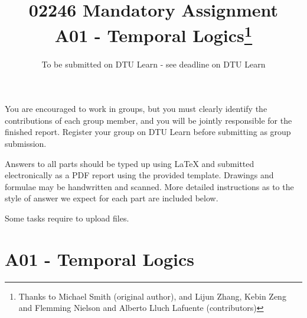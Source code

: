 \documentclass[12pt,a4paper]{article}
\title{02246 Mandatory Assignment\\
A01 - Temporal Logics\footnote{Thanks to Michael Smith (original author), and Lijun Zhang, Kebin Zeng and Flemming Nielson and Alberto Lluch Lafuente (contributors)}}
\date{To be submitted on DTU Learn - see deadline on DTU Learn}
\begin{document}
\maketitle

\noindent
You are encouraged to work in groups, 
but you must clearly identify the contributions of each group member, and you will be jointly responsible for the finished report. Register your group on DTU Learn before submitting as group submission. 
\par
Answers to all parts should be typed up using LaTeX and submitted electronically as a PDF report using the provided template. Drawings and formulae may be handwritten
and scanned. More detailed instructions as to the style of answer we expect for each part are included below.
\par
Some tasks require to upload files. %


\clearpage

\section*{A01 - Temporal Logics}

\newif\ifwithanswers
\withanswerstrue
\end{document}
